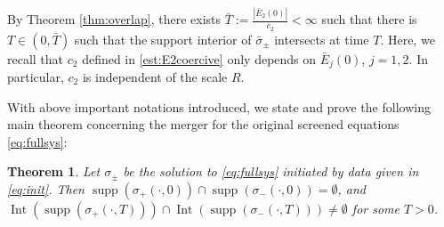 \documentclass[11pt,reqno]{amsproc}
\newtheorem{thm}{Theorem}
\DeclareMathOperator{\supp}{supp}
\DeclareMathOperator{\Int}{Int}
\begin{document}
By Theorem \ref{thm:overlap}, there exists $\bar T:= \frac{|\bar E_2(0)|}{c_2} < \infty$ such that there is $T \in (0,\bar T)$ such that the support interior of $\bar\sigma_\pm$ intersects at time $T$. Here, we recall that $c_2$ defined in \eqref{est:E2coercive} only depends on $\bar E_j(0)$, $j = 1,2$. In particular, $c_2$ is independent of the scale $R$. 

With above important notations introduced, we state and prove the following main theorem concerning the merger for the original screened equations \eqref{eq:fullsys}:
\begin{thm}\label{thm:overlapfull}
    Let $\sigma_\pm$ be the solution to \eqref{eq:fullsys} initiated by data given in \eqref{eq:init}. Then $\supp(\sigma_+(\cdot,0)) \cap \supp(\sigma_-(\cdot,0)) = \emptyset$, and $\Int(\supp(\sigma_+(\cdot,T))) \cap \Int(\supp(\sigma_-(\cdot,T))) \neq \emptyset$ for some $T > 0$.
\end{thm}
\end{document}
